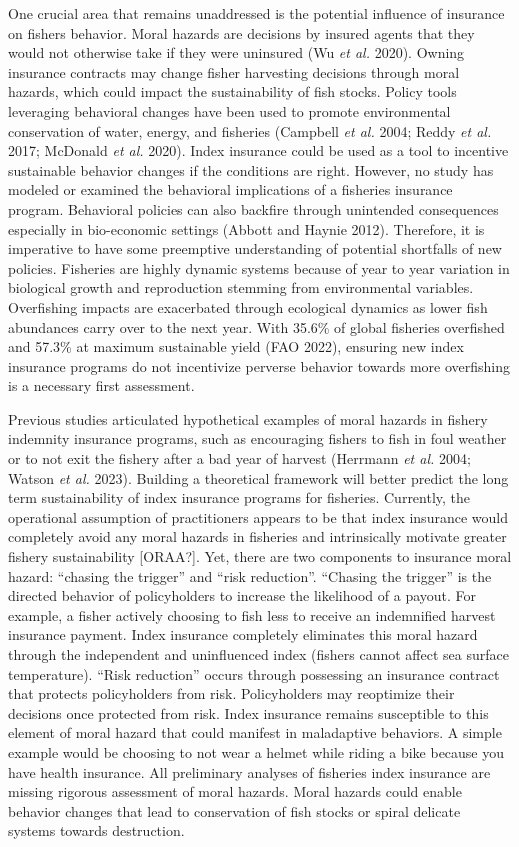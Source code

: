 \documentclass[
  letterpaper,
  DIV=11,
  numbers=noendperiod]{scrartcl}
\theoremstyle{plain}
\theoremstyle{plain}
\theoremstyle{remark}
\begin{document}
One crucial area that remains unaddressed is the potential influence of
insurance on fishers behavior. Moral hazards are decisions by insured
agents that they would not otherwise take if they were uninsured (Wu
\emph{et al.} 2020). Owning insurance contracts may change fisher
harvesting decisions through moral hazards, which could impact the
sustainability of fish stocks. Policy tools leveraging behavioral
changes have been used to promote environmental conservation of water,
energy, and fisheries (Campbell \emph{et al.} 2004; Reddy \emph{et al.}
2017; McDonald \emph{et al.} 2020). Index insurance could be used as a
tool to incentive sustainable behavior changes if the conditions are
right. However, no study has modeled or examined the behavioral
implications of a fisheries insurance program. Behavioral policies can
also backfire through unintended consequences especially in bio-economic
settings (Abbott and Haynie 2012). Therefore, it is imperative to have
some preemptive understanding of potential shortfalls of new policies.
Fisheries are highly dynamic systems because of year to year variation
in biological growth and reproduction stemming from environmental
variables. Overfishing impacts are exacerbated through ecological
dynamics as lower fish abundances carry over to the next year. With
35.6\% of global fisheries overfished and 57.3\% at maximum sustainable
yield (FAO 2022), ensuring new index insurance programs do not
incentivize perverse behavior towards more overfishing is a necessary
first assessment.

Previous studies articulated hypothetical examples of moral hazards in
fishery indemnity insurance programs, such as encouraging fishers to
fish in foul weather or to not exit the fishery after a bad year of
harvest (Herrmann \emph{et al.} 2004; Watson \emph{et al.} 2023).
Building a theoretical framework will better predict the long term
sustainability of index insurance programs for fisheries. Currently, the
operational assumption of practitioners appears to be that index
insurance would completely avoid any moral hazards in fisheries and
intrinsically motivate greater fishery sustainability {[}ORAA?{]}. Yet,
there are two components to insurance moral hazard: ``chasing the
trigger'' and ``risk reduction''. ``Chasing the trigger'' is the
directed behavior of policyholders to increase the likelihood of a
payout. For example, a fisher actively choosing to fish less to receive
an indemnified harvest insurance payment. Index insurance completely
eliminates this moral hazard through the independent and uninfluenced
index (fishers cannot affect sea surface temperature). ``Risk
reduction'' occurs through possessing an insurance contract that
protects policyholders from risk. Policyholders may reoptimize their
decisions once protected from risk. Index insurance remains susceptible
to this element of moral hazard that could manifest in maladaptive
behaviors. A simple example would be choosing to not wear a helmet while
riding a bike because you have health insurance. All preliminary
analyses of fisheries index insurance are missing rigorous assessment of
moral hazards. Moral hazards could enable behavior changes that lead to
conservation of fish stocks or spiral delicate systems towards
destruction.
\end{document}
